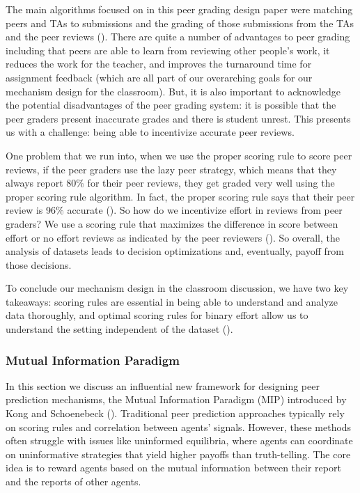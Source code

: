 \documentclass[
  letterpaper,
  numbers=noenddot,
  DIV=11]{scrreprt}
\theoremstyle{plain}
\theoremstyle{definition}
\theoremstyle{plain}
\theoremstyle{remark}
\begin{document}
The main algorithms focused on in this peer grading design paper were
matching peers and TAs to submissions and the grading of those
submissions from the TAs and the peer reviews
(). There are quite a
number of advantages to peer grading including that peers are able to
learn from reviewing other people's work, it reduces the work for the
teacher, and improves the turnaround time for assignment feedback (which
are all part of our overarching goals for our mechanism design for the
classroom). But, it is also important to acknowledge the potential
disadvantages of the peer grading system: it is possible that the peer
graders present inaccurate grades and there is student unrest. This
presents us with a challenge: being able to incentivize accurate peer
reviews.

One problem that we run into, when we use the proper scoring rule to
score peer reviews, if the peer graders use the lazy peer strategy,
which means that they always report 80\(\%\) for their peer reviews,
they get graded very well using the proper scoring rule algorithm. In
fact, the proper scoring rule says that their peer review is 96\(\%\)
accurate (). So how do we
incentivize effort in reviews from peer graders? We use a scoring rule
that maximizes the difference in score between effort or no effort
reviews as indicated by the peer reviewers
(). So overall, the
analysis of datasets leads to decision optimizations and, eventually,
payoff from those decisions.

To conclude our mechanism design in the classroom discussion, we have
two key takeaways: scoring rules are essential in being able to
understand and analyze data thoroughly, and optimal scoring rules for
binary effort allow us to understand the setting independent of the
dataset ().

\subsubsection*{Mutual Information
Paradigm}\label{mutual-information-paradigm}

In this section we discuss an influential new framework for designing
peer prediction mechanisms, the Mutual Information Paradigm (MIP)
introduced by Kong and Schoenebeck
().
Traditional peer prediction approaches typically rely on scoring rules
and correlation between agents' signals. However, these methods often
struggle with issues like uninformed equilibria, where agents can
coordinate on uninformative strategies that yield higher payoffs than
truth-telling. The core idea is to reward agents based on the mutual
information between their report and the reports of other agents.
\end{document}
